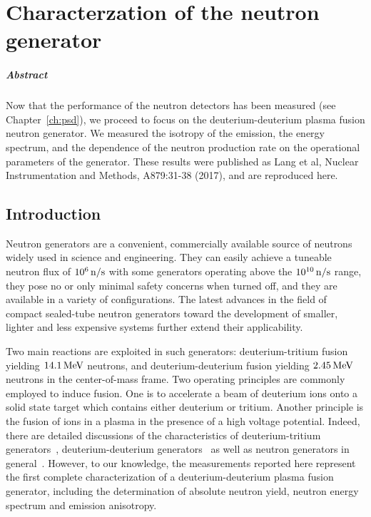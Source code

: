 
\chapter{Characterzation of the neutron generator}\label{ch:ng}

\paragraph{Abstract} Now that the performance of the neutron detectors has been measured (see Chapter~\ref{ch:psd}), we proceed to focus on the deuterium-deuterium plasma fusion neutron generator. We measured the isotropy of the emission, the energy spectrum, and the dependence of the neutron production rate on the operational parameters of the generator. These results were published as Lang et al, Nuclear Instrumentation and Methods, A879:31-38 (2017), and are reproduced here.

\section{Introduction}

Neutron generators are a convenient, commercially available source of neutrons widely used in science and engineering. They can easily achieve a tuneable neutron flux of $10^6\,\mathrm{n/s}$ with some generators operating above the $10^{10}\,\mathrm{n/s}$ range, they pose no or only minimal safety concerns when turned off, and they are available in a variety of configurations. The latest advances in the field of compact sealed-tube neutron generators toward the development of smaller, lighter and less expensive systems further extend their applicability.

Two main reactions are exploited in such generators: deuterium-tritium fusion yielding $14.1\,\mathrm{MeV}$ neutrons, and deuterium-deuterium fusion yielding $2.45\,\mathrm{MeV}$ neutrons in the center-of-mass frame. Two operating principles are commonly employed to induce fusion. One is to accelerate a beam of deuterium ions onto a solid state target which contains either deuterium or tritium. Another principle is the fusion of ions in a plasma in the presence of a high voltage potential. Indeed, there are detailed discussions of the characteristics of deuterium-tritium generators~\cite{Guillame:1971}, deuterium-deuterium generators~\cite{Miley:1997,Miley:1999,Miley:2000} as well as neutron generators in general~\cite{CRC,Chernikova:2014}. However, to our knowledge, the measurements reported here represent the first complete characterization of a deuterium-deuterium plasma fusion generator, including the determination of absolute neutron yield, neutron energy spectrum and emission anisotropy.

